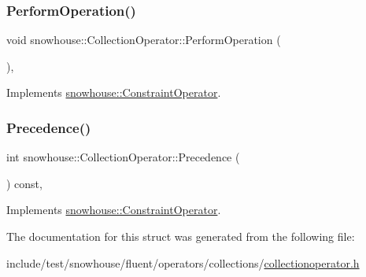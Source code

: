 \subsubsection{\texorpdfstring{PerformOperation()}{PerformOperation()}}
{\footnotesize\ttfamily void snowhouse\+::\+Collection\+Operator\+::\+Perform\+Operation (\begin{DoxyParamCaption}\item[{\mbox{\hyperlink{namespacesnowhouse_a719169b1315a13161c15f25e600a8f51}{Result\+Stack}} \&}]{ }\end{DoxyParamCaption})\hspace{0.3cm}{\ttfamily [inline]}, {\ttfamily [virtual]}}



Implements \mbox{\hyperlink{structsnowhouse_1_1ConstraintOperator_a885882868139127eb8ff3f3ec6a97737}{snowhouse\+::\+Constraint\+Operator}}.

\mbox{\label{structsnowhouse_1_1CollectionOperator_a07f46f3b8e9c56464624b55ba1b8189c}} 
\subsubsection{\texorpdfstring{Precedence()}{Precedence()}}
{\footnotesize\ttfamily int snowhouse\+::\+Collection\+Operator\+::\+Precedence (\begin{DoxyParamCaption}{ }\end{DoxyParamCaption}) const\hspace{0.3cm}{\ttfamily [inline]}, {\ttfamily [virtual]}}



Implements \mbox{\hyperlink{structsnowhouse_1_1ConstraintOperator_ac7c231c1a9f183c0a2cce8544566eeff}{snowhouse\+::\+Constraint\+Operator}}.



The documentation for this struct was generated from the following file\+:\begin{DoxyCompactItemize}
\item 
include/test/snowhouse/fluent/operators/collections/\mbox{\hyperlink{collectionoperator_8h}{collectionoperator.\+h}}\end{DoxyCompactItemize}
